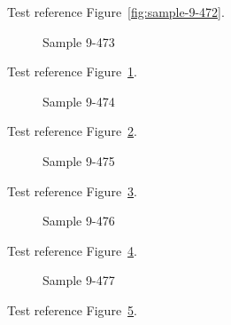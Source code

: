 Test reference Figure~\ref{fig:sample-9-472}.

\begin{figure}[tbhp]
\caption{Sample 9-473}
\label{fig:sample-9-473}
\end{figure}

Test reference Figure~\ref{fig:sample-9-473}.

\begin{figure}[tbhp]
\caption{Sample 9-474}
\label{fig:sample-9-474}
\end{figure}

Test reference Figure~\ref{fig:sample-9-474}.

\begin{figure}[tbhp]
\caption{Sample 9-475}
\label{fig:sample-9-475}
\end{figure}

Test reference Figure~\ref{fig:sample-9-475}.

\begin{figure}[tbhp]
\caption{Sample 9-476}
\label{fig:sample-9-476}
\end{figure}

Test reference Figure~\ref{fig:sample-9-476}.

\begin{figure}[tbhp]
\caption{Sample 9-477}
\label{fig:sample-9-477}
\end{figure}

Test reference Figure~\ref{fig:sample-9-477}.

